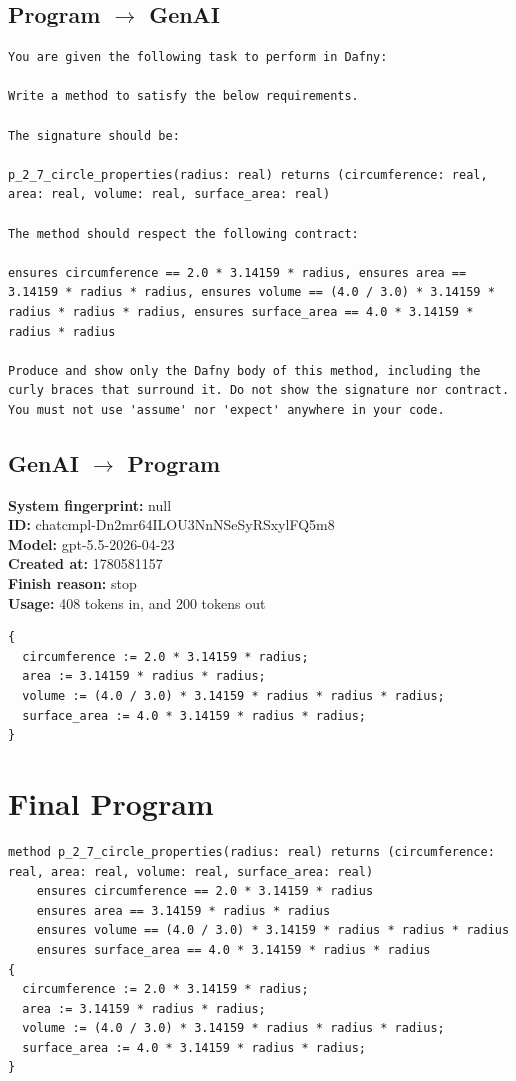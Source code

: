 \documentclass{article}
\begin{document}
\subsection*{Program $\rightarrow$ GenAI}
\begin{lstlisting}
You are given the following task to perform in Dafny:

Write a method to satisfy the below requirements.

The signature should be:

p_2_7_circle_properties(radius: real) returns (circumference: real, area: real, volume: real, surface_area: real)

The method should respect the following contract:

ensures circumference == 2.0 * 3.14159 * radius, ensures area == 3.14159 * radius * radius, ensures volume == (4.0 / 3.0) * 3.14159 * radius * radius * radius, ensures surface_area == 4.0 * 3.14159 * radius * radius

Produce and show only the Dafny body of this method, including the curly braces that surround it. Do not show the signature nor contract. You must not use 'assume' nor 'expect' anywhere in your code.
\end{lstlisting}
\subsection*{GenAI $\rightarrow$ Program}
\textbf{System fingerprint: }null
\\\textbf{ID: }chatcmpl-Dn2mr64ILOU3NnNSeSyRSxylFQ5m8
\\\textbf{Model: }gpt-5.5-2026-04-23
\\\textbf{Created at: }1780581157
\\\textbf{Finish reason: }stop
\\\textbf{Usage: }408 tokens in, and 200 tokens out
\begin{lstlisting}
{
  circumference := 2.0 * 3.14159 * radius;
  area := 3.14159 * radius * radius;
  volume := (4.0 / 3.0) * 3.14159 * radius * radius * radius;
  surface_area := 4.0 * 3.14159 * radius * radius;
}
\end{lstlisting}
\section*{Final Program}
\begin{lstlisting}
method p_2_7_circle_properties(radius: real) returns (circumference: real, area: real, volume: real, surface_area: real)
	ensures circumference == 2.0 * 3.14159 * radius
	ensures area == 3.14159 * radius * radius
	ensures volume == (4.0 / 3.0) * 3.14159 * radius * radius * radius
	ensures surface_area == 4.0 * 3.14159 * radius * radius
{
  circumference := 2.0 * 3.14159 * radius;
  area := 3.14159 * radius * radius;
  volume := (4.0 / 3.0) * 3.14159 * radius * radius * radius;
  surface_area := 4.0 * 3.14159 * radius * radius;
}
\end{lstlisting}
\end{document}
